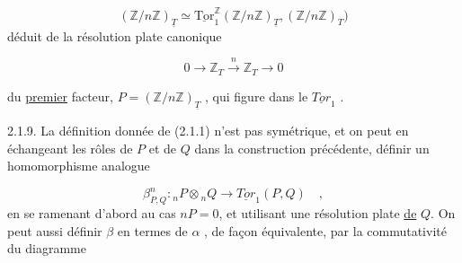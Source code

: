 \begin{equation}\tag{2.1.8.1}
(\mathbb{Z}/n\mathbb{Z})_{\underline{T}} \simeq \underline{\mathrm{Tor}}_1^{\mathbb{Z}} (\mathbb{Z}/ n\mathbb{Z})_{\underline{T}} , (\mathbb{Z}/n\mathbb{Z})_T)
\end{equation}
déduit de la résolution plate canonique

\begin{equation}\tag{2.1.8.2}
0 \longrightarrow \mathbb{Z}_T \stackrel{n}{\longrightarrow} \mathbb{Z}_T \longrightarrow 0
\end{equation}


 du \underline{premier} facteur, $P = (\mathbb{Z}/n\mathbb{Z})_{\underline{T}}$ , qui figure dans le $\underline{Tor}_1$ .

2.1.9. La définition donnée de (2.1.1) n'est pas symétrique, et on peut en échangeant les rôles de $P$ et de $Q$ dans la construction précédente, définir un homomorphisme analogue

\begin{equation}\tag{2.1.9.1}
\beta^n_{P,Q} : {}_nP \otimes {}_nQ \longrightarrow \underline{Tor}_1(P,Q) \quad ,
\end{equation}
en se ramenant d'abord au cas $nP=0$, et utilisant une résolution plate \underline{de} $Q$. On peut aussi définir $\beta$ en termes de $\alpha$ , de façon équivalente, par la commutativité du diagramme

